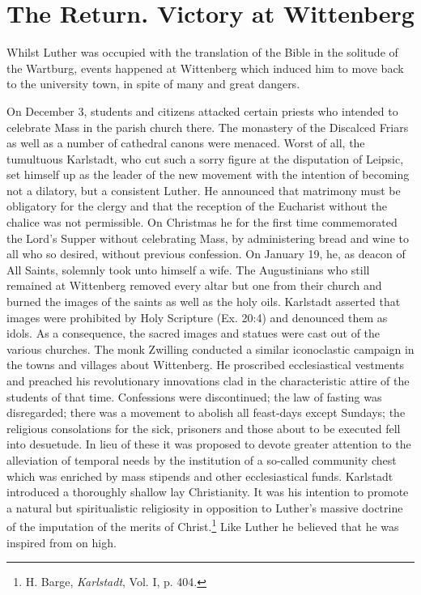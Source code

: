 \section{The Return. Victory at Wittenberg}

Whilst Luther was occupied with the translation of the Bible in
the solitude of the Wartburg, events happened at Wittenberg which
induced him to move back to the university town, in spite of many
and great dangers.

On December 3, students and citizens attacked certain priests who
intended to celebrate Mass in the parish church there. The monastery
of the Discalced Friars as well as a number of cathedral canons were
menaced. Worst of all, the tumultuous Karlstadt, who cut such a sorry
figure at the disputation of Leipsic, set himself up as the leader of the
new movement with the intention of becoming not a dilatory, but a
consistent Luther. He announced that matrimony must be obligatory
for the clergy and that the reception of the Eucharist without the
chalice was not permissible. On Christmas he for the first time commemorated
the Lord’s Supper without celebrating Mass, by administering
bread and wine to all who so desired, without previous confession. On January
19, he, as deacon of All Saints, solemnly took unto
himself a wife. The Augustinians who still remained at Wittenberg
removed every altar but one from their church and burned the images
of the saints as well as the holy oils. Karlstadt asserted that images
were prohibited by Holy Scripture (Ex. 20:4) and denounced them
as idols. As a consequence, the sacred images and statues were cast
out of the various churches. The monk Zwilling conducted a similar
iconoclastic campaign in the towns and villages about Wittenberg.
He proscribed ecclesiastical vestments and preached his revolutionary
innovations clad in the characteristic attire of the students of that
time. Confessions were discontinued; the law of fasting was disregarded;
there was a movement to abolish all feast-days except Sundays; the religious
consolations for the sick, prisoners and those about
to be executed fell into desuetude. In lieu of these it was proposed to
devote greater attention to the alleviation of temporal needs by the institution
of a so-called community chest which was enriched by mass
stipends and other ecclesiastical funds. Karlstadt introduced a thoroughly
shallow lay Christianity. It was his intention to promote a natural but
spiritualistic religiosity in opposition to Luther’s massive
doctrine of the imputation of the merits of Christ.\footnote
{H. Barge, \textit{Karlstadt}, Vol. I, p. 404.}
Like Luther he believed that he was inspired from on high.

